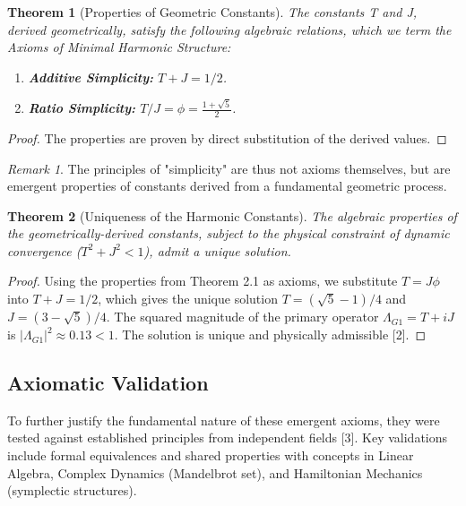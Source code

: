 \documentclass{article}
\theoremstyle{plain}
\newtheorem{theorem}{Theorem}[section]
\theoremstyle{definition}
\theoremstyle{remark}
\newtheorem*{remark}{Remark}
\begin{document}
\begin{theorem}[Properties of Geometric Constants]
The constants T and J, derived geometrically, satisfy the following algebraic relations, which we term the Axioms of Minimal Harmonic Structure:
\begin{enumerate}
    \item \textbf{Additive Simplicity:} $T+J = 1/2$.
    \item \textbf{Ratio Simplicity:} $T/J = \phi = \frac{1+\sqrt{5}}{2}$.
\end{enumerate}
\end{theorem}
\begin{proof}
The properties are proven by direct substitution of the derived values.
\end{proof}

\begin{remark}
The principles of "simplicity" are thus not axioms themselves, but are emergent properties of constants derived from a fundamental geometric process.
\end{remark}

\begin{theorem}[Uniqueness of the Harmonic Constants]
The algebraic properties of the geometrically-derived constants, subject to the physical constraint of dynamic convergence ($T^2+J^2 < 1$), admit a unique solution.
\end{theorem}
\begin{proof}
Using the properties from Theorem 2.1 as axioms, we substitute $T=J\phi$ into $T+J=1/2$, which gives the unique solution $T=(\sqrt{5}-1)/4$ and $J=(3-\sqrt{5})/4$. The squared magnitude of the primary operator $\Lambda_{G1} = T+iJ$ is $|\Lambda_{G1}|^2 \approx 0.13 < 1$. The solution is unique and physically admissible [2].
\end{proof}


\subsection{Axiomatic Validation}
To further justify the fundamental nature of these emergent axioms, they were tested against established principles from independent fields [3]. Key validations include formal equivalences and shared properties with concepts in Linear Algebra, Complex Dynamics (Mandelbrot set), and Hamiltonian Mechanics (symplectic structures).
\end{document}
